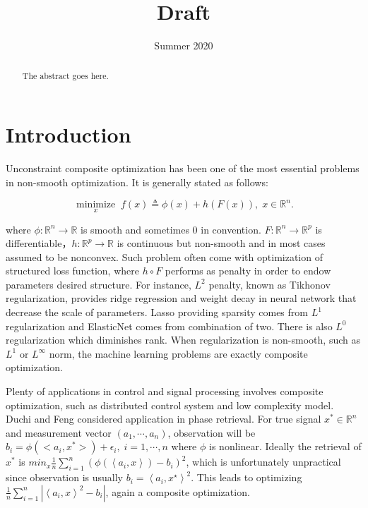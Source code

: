 \documentclass[10pt, oneside]{article}
\title{
Draft
}
\author{}
\date{Summer 2020}
\begin{document}
\maketitle
\vspace{.25in}
\begin{abstract}
The abstract goes here.
\end{abstract}
\vspace{.25in}

\section{Introduction}
Unconstraint composite optimization has been one of the most essential problems in non-smooth optimization. It is generally stated as follows:

\begin{equation}
\underset{x}{\operatorname{minimize}} \; f(x) \triangleq \phi(x)+h(F(x)),  \; x \in \mathbb{R}^n. 
\label{problem}
\end{equation}

where $\phi: \mathbb{R}^n\rightarrow \mathbb{R}$ is smooth and sometimes 0 in convention. $F: \mathbb{R}^{n} \rightarrow \mathbb{R}^{p}$ is differentiable，$h: \mathbb{R}^{p} \rightarrow \mathbb{R}$ is continuous but non-smooth and in most cases assumed to be nonconvex. Such problem often come with optimization of structured loss function, where $h\circ F$ performs as penalty in order to endow parameters desired structure. For instance, $L^2$ penalty, known as Tikhonov regularization,  provides ridge regression and weight decay in neural network that decrease the scale of parameters. Lasso \cite{Lasso} providing sparsity comes from $L^1$ regularization and ElasticNet \cite{ElasticNet} comes from combination of two. There is also $L^0$ regularization which diminishes rank. When regularization is non-smooth, such as $L^1$ or $L^{\infty}$ norm\cite{NonlinearEqLInfty}, the machine learning problems are exactly composite optimization. 
\par
Plenty of applications in control and signal processing involves composite optimization\cite{CharalambousC}, such as distributed control system\cite{distributedcontrol} and low complexity model\cite{lowcomplexity}. Duchi and Feng \cite{phaseretrieval} considered application in phase retrieval. For true signal $x^*\in \mathbb{R}^n$ and measurement vector $(a_1,\cdots,a_n)$, observation will be $b_i=\phi(<a_i,x^*>)+\epsilon_i,\;i=1,\cdots,n$ where $\phi$ is nonlinear. Ideally the retrieval of $x^*$ is $min_x \frac{1}{n} \sum_{i=1}^{n}\left(\phi\left(\left\langle a_{i}, x\right\rangle\right)-b_{i}\right)^{2}$, which is unfortunately unpractical since observation is usually $b_{i}=\left\langle a_{i}, x^{\star}\right\rangle^{2}$. This leads to optimizing $\frac{1}{n} \sum_{i=1}^{n}\left|\left\langle a_{i}, x\right\rangle^{2}-b_{i}\right|$, again a composite optimization. 
\par
\end{document}
